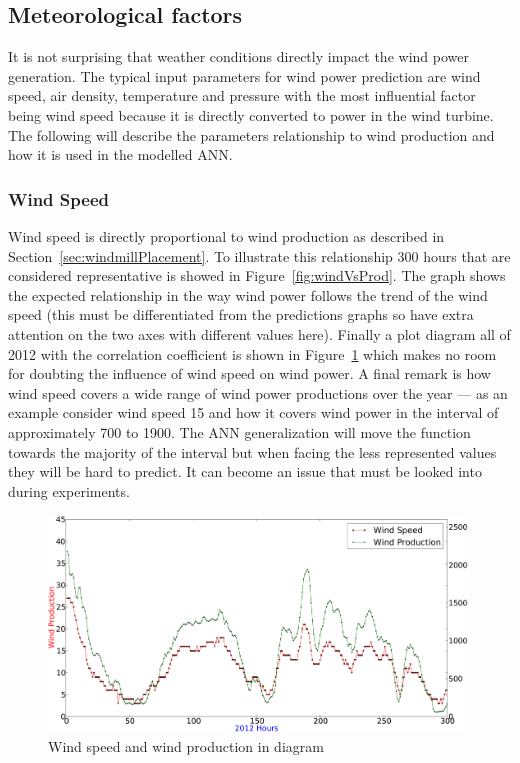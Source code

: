 \subsection{Meteorological factors}
It is not surprising that weather conditions directly impact the wind power generation. The typical input parameters for wind power prediction are wind speed, air density, temperature and pressure \cite{WindPowerGenerationUsingANN} with the most influential factor being wind speed because it is directly converted to power in the wind turbine. The following will describe the parameters relationship to wind production and how it is used in the modelled ANN.

\subsubsection{Wind Speed}
\label{sec:windPowerWindSpeed}
Wind speed is directly proportional to wind production as described in Section~\ref{sec:windmillPlacement}. To illustrate this relationship 300 hours that are considered representative is showed in Figure~\ref{fig:windVsProd}.  The graph shows the expected relationship in the way wind power follows the trend of the wind speed (this must be differentiated from the predictions graphs so have extra attention on the two axes with different values here). Finally a plot diagram all of 2012 with the correlation coefficient is shown in Figure~\ref{fig:windSpeedWindProductionPlot} which makes no room for doubting the influence of wind speed on wind power. A final remark is how wind speed covers a wide range of wind power productions over the year --- as an example consider wind speed 15 and how it covers wind power in the interval of approximately 700 to 1900. The ANN generalization will move the function towards the majority of the interval but when facing the less represented values they will be hard to predict. It can become an issue that must be looked into during experiments.  

\begin{figure}[h!]
\centering
\includegraphics[width=0.99\textwidth]{billeder/windSpeedWindProductionPlot.png}
\caption{Wind speed and wind production in diagram}
\label{fig:windSpeedWindProductionPlot}
\end{figure}

